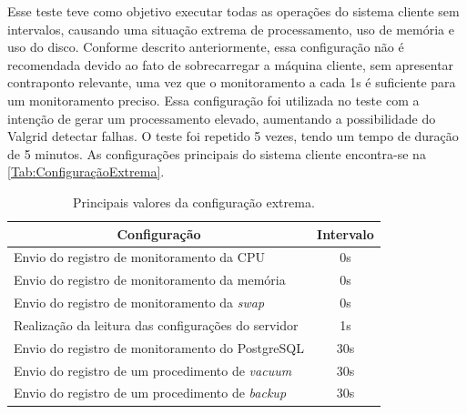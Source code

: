 Esse teste teve como objetivo executar todas as operações do sistema cliente sem intervalos, causando uma situação extrema de processamento, uso de memória e uso do disco. Conforme descrito anteriormente, essa configuração não é recomendada devido ao fato de sobrecarregar a máquina cliente, sem apresentar contraponto relevante, uma vez que o monitoramento a cada 1s é suficiente para um monitoramento preciso. Essa configuração foi utilizada no teste com a intenção de gerar um processamento elevado, aumentando a possibilidade do Valgrid detectar falhas. O teste foi repetido 5 vezes, tendo um tempo de duração de 5 minutos. As configurações principais do sistema cliente encontra-se na \autoref{Tab:ConfiguraçãoExtrema}.


\begin{table}[H]
\centering
\label{my-label}
\begin{tabular}{|l|c|}
\hline
\multicolumn{1}{|c|}{{\color[HTML]{000000} \textbf{Configuração}}} & {\color[HTML]{000000} \textbf{Intervalo}} \\ \hline
Envio do registro de monitoramento da CPU                 & 0s                                                                        \\ \hline
Envio do registro de monitoramento da memória             & 0s                                                                        \\ \hline
Envio do registro de monitoramento da \textit{swap}                & 0s                                                                        \\ \hline
Realização da leitura das configurações do servidor       & 1s                                                                       \\ \hline
Envio do registro de monitoramento do PostgreSQL          & 30s                                                                       \\ \hline
Envio do registro de um procedimento de \textit{vacuum}   & 30s                                                                       \\ \hline
Envio do registro de um procedimento de \textit{backup}   & 30s                                                                       \\ \hline
\end{tabular}
\caption[Principais valores da configuração extrema.]{Principais valores da configuração extrema.}
\label{Tab:ConfiguraçãoExtrema}
\end{table}

